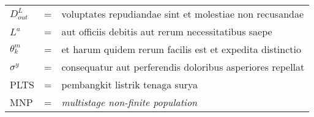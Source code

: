 \setlength{\LTleft}{0pt}
{
\begin{longtable}{llp{288pt}}
$D_{out}^L$						& = & voluptates repudiandae sint et molestiae non recusandae\\
$L^a$							& = & aut officiis debitis aut rerum necessitatibus saepe\\
$\theta^m_k$					& = & et harum quidem rerum facilis est et expedita distinctio\\
$\sigma^y$						& = & consequatur aut perferendis doloribus asperiores repellat\\
PLTS                            & = & pembangkit listrik tenaga surya\\
MNP								& = & \textit{multistage non-finite population}\\
\end{longtable}
}
